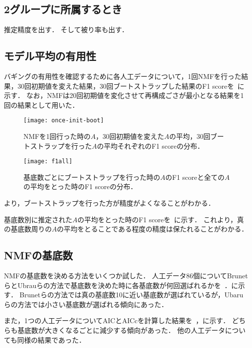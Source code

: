 \subsection{2グループに所属するとき}
推定精度を出す．
そして被り率も出す．

\subsection{モデル平均の有用性}
バギングの有用性を確認するために各人工データについて，1回NMFを行った結果，30回初期値を変えた結果，30回ブートストラップした結果のF1 scoreを~に示す．
なお，NMFは20回初期値を変化させて再構成ごさが最小となる結果を1回の結果として用いた．
\begin{figure}[htbp]
    \begin{minipage}{0.5\hsize}
			\begin{center}
					\texttt{[image: once-init-boot]}
					\caption{NMFを1回行った時の$A$，30回初期値を変えた$A$の平均，30回ブートストラップを行った$A$の平均それぞれのF1 scoreの分布．}
					\label{fig:once-init-boot}
			\end{center}
		\end{minipage}
    \begin{minipage}{0.5\hsize}
			\begin{center}
					\texttt{[image: f1all]}
					\caption{基底数ごとにブートストラップを行った時の$A$のF1 scoreと全ての$A$の平均をとった時のF1 scoreの分布．}
					\label{fig:f1all}
			\end{center}
		\end{minipage}
\end{figure}
より，ブートストラップを行った方が精度がよくなることがわかる．

基底数別に推定された$A$の平均をとった時のF1 scoreを~に示す．
これより，真の基底数周りの$A$の平均をとることである程度の精度は保たれることがわかる．

\subsection{NMFの基底数}
NMFの基底数を決める方法をいくつか試した．
人工データ86個についてBrunetらとUbrauらの方法で基底数を決めた時に各基底数が何回選ばれるかを~．に示す．
Brunetらの方法では真の基底数10に近い基底数が選ばれているが，Ubaruらの方法では小さい基底数が選ばれる傾向にあった．

また，1つの人工データについてAICとAICcを計算した結果を~，に示す．
どちらも基底数が大きくなるごとに減少する傾向があった．
他の人工データについても同様の結果であった．

